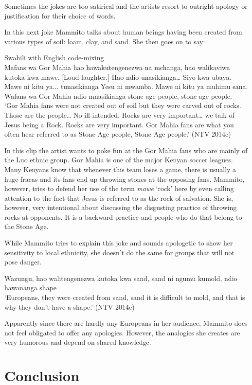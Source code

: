 \documentclass[output=paper]{langsci/langscibook}
\begin{document}
Sometimes the jokes are too satirical and the artists resort to outright apology or justification for their choice of words. 

In this next joke Mammito talks about human beings having been created from various types of soil: loam, clay, and sand. She then goes on to say:

\ea
{Swahili with English code-mixing}\\
Mafans wa Gor Mahia hao hawakutengenezwa na mchanga, hao walikaviwa kutoka kwa mawe. \textup{[Loud laughter.]} Hao ndio unasikianga… Siyo kwa ubaya. Mawe ni kitu ya... tunasikianga Yesu ni mwamba. Mawe ni kitu ya muhimu sana. Wafans wa Gor Mahia ndio mnasikianga stone age people, stone age people.\\
\glt ‘Gor Mahia fans were not created out of soil but they were carved out of rocks. Those are the people… No ill intended. Rocks are very important… we talk of Jesus being a Rock. Rocks are very important. Gor Mahia fans are what you often hear referred to as Stone Age people, Stone Age people.’ (NTV 2014c)
\z

In this clip the artist wants to poke fun at the Gor Mahia fans who are mainly of the Luo ethnic group. Gor Mahia is one of the major Kenyan soccer leagues. Many Kenyans know that whenever this team loses a game, there is usually a huge fracas and its fans end up throwing stones at the opposing fans. Mammito, however, tries to defend her use of the term \textit{mawe }‘rock’ here by even calling attention to the fact that Jesus is referred to as the rock of salvation. She is, however, very intentional about discussing the disgusting practice of throwing rocks at opponents. It is a backward practice and people who do that belong to the Stone Age.

While Mammito tries to explain this joke and sounds apologetic to show her sensitivity to local ethnicity, she doesn’t do the same for groups that will not pose danger. 
 
\ea
 Wazungu, hao walitengenezwa kutoka kwa sand, sand ni ngumu kumold, ndio hawananga shape \\
\glt ‘Europeans, they were created from sand, sand it is difficult to mold, and that is why they don’t have a shape.’ (NTV 2014c)
\z

Apparently since there are hardly any Europeans in her audience, Mammito does not feel obligated to offer any apologies. However, the analogies she creates are very humorous and depend on shared knowledge. 

\section{Conclusion}
\end{document}

